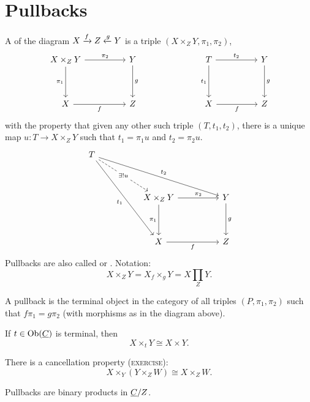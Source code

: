 
\section{Pullbacks}

\begin{definition*}
	A  of the diagram \( X \xrightarrow{f} Z \xleftarrow{g} Y \) is a triple \( (X \times_Z Y, \pi_1, \pi_2) \),
	\[
		\begin{tikzcd}{X \times_Z Y} && Y &&& T && Y \\
			\\
			X && Z &&& X && Z
			\arrow["{\pi_2}", from=1-1, to=1-3]
			\arrow["{\pi_1}"', from=1-1, to=3-1]
			\arrow["g", from=1-3, to=3-3]
			\arrow["{t_2}", from=1-6, to=1-8]
			\arrow["{t_1}"', from=1-6, to=3-6]
			\arrow["g", from=1-8, to=3-8]
			\arrow["f"', from=3-1, to=3-3]
			\arrow["f"', from=3-6, to=3-8]
		\end{tikzcd}
	\]
	with the property that given any other such triple \( (T, t_1, t_2) \), there is a unique map \( u: T \to X \times_Z Y \) such that \( t_1 = \pi_1 u \) and \( t_2 = \pi_2 u \).
	\[
		\begin{tikzcd}
			T \\
			\\
			&& {X \times_Z Y} && Y \\
			\\
			&& X && Z
			\arrow["{\exists! u}"{description}, dashed, from=1-1, to=3-3]
			\arrow["{t_2}", from=1-1, to=3-5]
			\arrow["{t_1}"', from=1-1, to=5-3]
			\arrow["{\pi_2}", from=3-3, to=3-5]
			\arrow["{\pi_1}"', from=3-3, to=5-3]
			\arrow["g", from=3-5, to=5-5]
			\arrow["f"', from=5-3, to=5-5]
		\end{tikzcd}
	\]
	Pullbacks are also called  or . Notation:
	\[
		X \times_Z Y = X {}_f\times_g Y = X \prod_Z Y.
	\]
\end{definition*}

\begin{remarks*}
	\item A pullback is the terminal object in the category of all triples \( (P, \pi_1, \pi_2) \) such that \( f\pi_1 = g\pi_2 \) (with morphisms as in the diagram above).
	\item If \( t \in \operatorname{Ob}(\underline{C}) \) is terminal, then
		\[
			X \times_t Y \cong X \times Y.
		\]
	\item There is a cancellation property (\textsc{exercise}):
		\[
			X \times_Y (Y \times_Z W) \cong X \times_Z W.
		\]
	\item Pullbacks are binary products in \( \underline{C}/Z \).
\end{remarks*}

